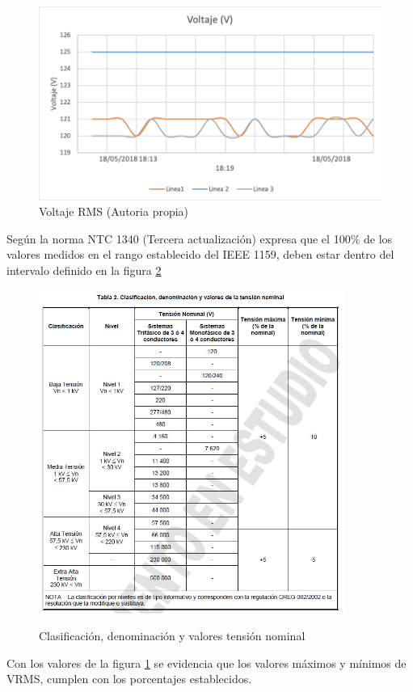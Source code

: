 \begin{figure}[H]
\centering
\includegraphics{2Marco/voltaje-rms}
\caption{Voltaje RMS (Autoria propia)} 
\label{fig:voltaje-rms}
\end{figure} 

Según la norma NTC 1340 (Tercera actualización) expresa que el 100\% de los valores medidos en el rango establecido del IEEE 1159, deben estar dentro del intervalo definido en la figura \ref{fig:tension-nominal}

\begin{figure}[H]
\centering
\includegraphics[width = 10cm]{2Marco/tension-nominal}
\caption{Clasificación, denominación y valores tensión nominal} \cite{A44}
\label{fig:tension-nominal}
\end{figure} 

Con los valores de la figura \ref{fig:voltaje-rms} se evidencia que los valores máximos y mínimos de VRMS, cumplen con los porcentajes establecidos.


